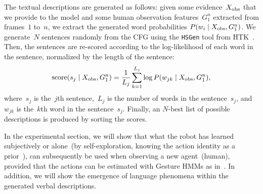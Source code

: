 The textual descriptions are generated as follows: given some evidence~$X_\text{obs}$ that we provide to the model and some human observation features~$G_1^n$ extracted from frames~$1$ to~$n$, we extract the generated word probabilities
$P(w_i \mid X_\text{obs}, G_1^n)$.
We generate~$N$ sentences randomly from the \ac{CFG} using the \texttt{HSGen} tool from HTK~\cite{young:htkbook}.
Then, the sentences are re-scored according to the log-likelihood of each word in the sentence, normalized by the length of the sentence:
\begin{equation} \label{eq:sentence_score}
  \text{score}(s_j \given \xobs, G_1^n) = \frac{1}{L_j} \sum_{k=1}^{L_j} \log P(w_{jk} \given \xobs, G_1^n),
\end{equation}
where~$s_j$ is the~$j$th sentence,~$L_j$ is the number of words in the sentence~$s_j$, and~$w_{jk}$ is the~$k$th word in the sentence~$s_j$.
Finally, an $N$-best list of possible descriptions is produced by sorting the scores.

%
%
%
%

\bigskip

In the experimental section, we will show that what the robot has learned subjectively or alone~(by self-exploration, knowing the action identity as a prior~\cite{salvi:2012:smcb}), can subsequently be used when observing a new agent~(human), provided that the actions can be estimated with Gesture \acp{HMM} as in~\cite{saponaro:2013:crhri}.
In addition, we will show the emergence of language phenomena within the generated verbal descriptions.
